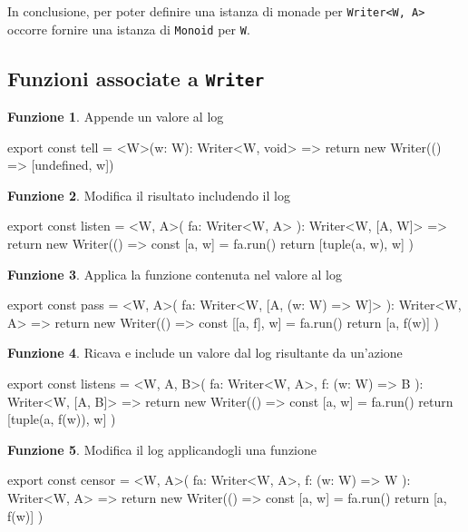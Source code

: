 \documentclass[12pt]{article}
\theoremstyle{definition}
\newtheorem{function}{Funzione}[section]
\newenvironment{code}
  {\vspace{0.5cm} \VerbatimEnvironment\begin{typescriptcode}}
  {\end{typescriptcode} \vspace{0.2cm}}
\begin{document}
In conclusione, per poter definire una istanza di monade per \texttt{Writer<W, A>}
occorre fornire una istanza di \texttt{Monoid} per \texttt{W}.

\subsection{Funzioni associate a \texttt{Writer}}

\begin{function}
Appende un valore al log

\begin{code}
export const tell = <W>(w: W): Writer<W, void> => {
  return new Writer(() => [undefined, w])
}
\end{code}
\end{function}

\begin{function}
Modifica il risultato includendo il log

\begin{code}
export const listen = <W, A>(
  fa: Writer<W, A>
): Writer<W, [A, W]> => {
  return new Writer(() => {
    const [a, w] = fa.run()
    return [tuple(a, w), w]
  })
}
\end{code}
\end{function}

\begin{function}
Applica la funzione contenuta nel valore al log

\begin{code}
export const pass = <W, A>(
  fa: Writer<W, [A, (w: W) => W]>
): Writer<W, A> => {
  return new Writer(() => {
    const [[a, f], w] = fa.run()
    return [a, f(w)]
  })
}
\end{code}
\end{function}

\begin{function}
Ricava e include un valore dal log risultante da un'azione

\begin{code}
export const listens = <W, A, B>(
  fa: Writer<W, A>,
  f: (w: W) => B
): Writer<W, [A, B]> => {
  return new Writer(() => {
    const [a, w] = fa.run()
    return [tuple(a, f(w)), w]
  })
}
\end{code}
\end{function}

\begin{function}
Modifica il log applicandogli una funzione

\begin{code}
export const censor = <W, A>(
  fa: Writer<W, A>,
  f: (w: W) => W
): Writer<W, A> => {
  return new Writer(() => {
    const [a, w] = fa.run()
    return [a, f(w)]
  })
}
\end{code}
\end{function}
\end{document}
